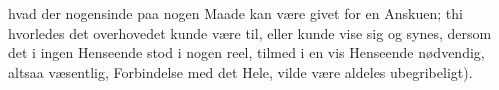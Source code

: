 \documentclass[12pt]{book}
\def\textit#1{#1}%
\def\\{ }%
\newcommand{\rubrik}[2]{%
  \par\vspace{1.1\baselineskip}%
  \begin{center}
    {\large\textit{#1}\par}\vspace{0.35\baselineskip}
    {#2\par}
  \end{center}
  \vspace{0.5\baselineskip}
  \phantomsection
  \addcontentsline{toc}{section}{\texorpdfstring{#1\ #2}{#1 #2}}%
}
\newcommand{\opage}[1]{\marginnote{\footnotesize\textit{[#1]}}}
\begin{document}
\opage{153} %
hvad der nogensinde paa nogen Maade kan være givet for en Anskuen; thi hvorledes det
overhovedet kunde være til, eller kunde vise sig og synes, dersom det i ingen Henseende
stod i nogen reel, tilmed i en vis Henseende nødvendig, altsaa væsentlig, Forbindelse
med det Hele, vilde være aldeles ubegribeligt).
\end{document}
